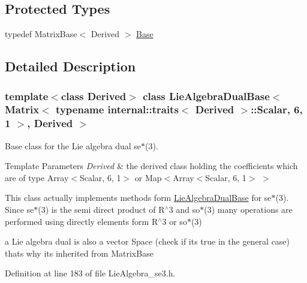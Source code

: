 \subsection*{Protected Types}
\begin{DoxyCompactItemize}
\item 
typedef Matrix\+Base$<$ Derived $>$ \hyperlink{class_lie_algebra_dual_base_3_01_matrix_3_01typename_01internal_1_1traits_3_01_derived_01_4_1_1_7557dc73cbfcbc32e399b9855a977d47_a13f7decf31323f6148ba81f7431a8bac}{Base}
\end{DoxyCompactItemize}


\subsection{Detailed Description}
\subsubsection*{template$<$class Derived$>$\newline
class Lie\+Algebra\+Dual\+Base$<$ Matrix$<$ typename internal\+::traits$<$ Derived $>$\+::\+Scalar, 6, 1 $>$, Derived $>$}

Base class for the Lie algebra dual se$\ast$(3). 


\begin{DoxyTemplParams}{Template Parameters}
{\em Derived} & the derived class holding the coefficients which are of type Array$<$\+Scalar, 6, 1$>$ or Map$<$Array$<$\+Scalar, 6, 1$>$ $>$\\
\hline
\end{DoxyTemplParams}
This class actually implements methods form \hyperlink{class_lie_algebra_dual_base}{Lie\+Algebra\+Dual\+Base} for se$\ast$(3). Since se$\ast$(3) is the semi direct product of R$^\wedge$3 and so$\ast$(3) many operations are performed using directly elements form R$^\wedge$3 or so$\ast$(3)

a Lie algebra dual is also a vector Space (check if it\textquotesingle{}s true in the general case) that\textquotesingle{}s why it\textquotesingle{}s inherited from Matrix\+Base 

Definition at line 183 of file Lie\+Algebra\+\_\+se3.\+h.



